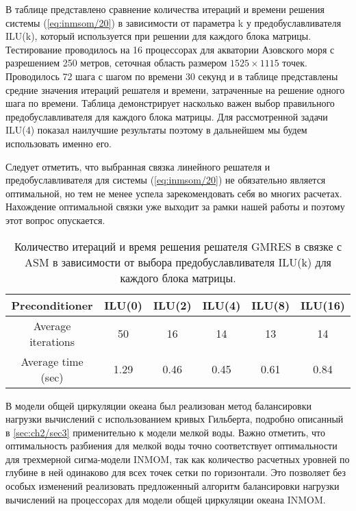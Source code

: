     В таблице представлено сравнение количества итераций и времени решения системы (\ref{eq:inmsom/20})
    в зависимости от параметра k у предобуславливателя ILU(k), который используется при решении для каждого блока матрицы. Тестирование проводилось на 16 процессорах для акватории Азовского моря с разрешением 250 метров, сеточная область размером $1525 \times 1115$ точек. Проводилось 72 шага с шагом по времени 30 секунд и в таблице представлены средние значения итераций решателя и времени, затраченные на решение одного шага по времени.      
    Таблица демонстрирует насколько важен выбор правильного предобуславливателя для каждого блока матрицы. Для рассмотренной задачи ILU(4) показал наилучшие результаты поэтому в дальнейшем мы будем использовать именно его.
    
    Следует отметить, что выбранная связка линейного решателя и предобуславливателя
    для системы (\ref{eq:inmsom/20}) не обязательно является оптимальной,
    но тем не менее успела зарекомендовать себя во многих расчетах.
    Нахождение оптимальной связки уже выходит за рамки нашей работы и 
    поэтому этот вопрос опускается.

\bigskip

\begin{table}[htb!]
\caption{Количество итераций и время решения решателя GMRES в связке с ASM в зависимости от выбора предобуславливателя ILU(k) для каждого блока матрицы.}
\begin{tabular}{|c|c|c|c|c|c|}
\hline 
Preconditioner & ILU(0) & ILU(2) & ILU(4) & ILU(8) & ILU(16) \\ 
\hline 
Average iterations & 50 & 16 & 14 & 13 & 14 \\ 
\hline 
Average time (sec) & 1.29 & 0.46 & 0.45 & 0.61 & 0.84 \\ 
\hline 
\end{tabular} 
\end{table}



	В модели общей циркуляции океана был реализован метод балансировки нагрузки вычислений с использованием кривых Гильберта, подробно описанный в \ref{sec:ch2/sec3} применительно к модели мелкой воды. Важно отметить, что оптимальность разбиения для мелкой воды точно соответствует оптимальности для трехмерной сигма-модели INMOM, так как количество расчетных уровней по глубине в ней одинаково для всех точек сетки по горизонтали. Это позволяет без особых изменений реализовать предложенный алгоритм балансировки нагрузки вычислений на процессорах для модели общей циркуляции океана INMOM.
	
\FloatBarrier
